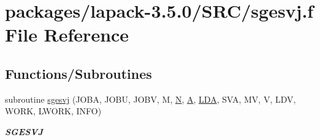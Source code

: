 \hypertarget{sgesvj_8f}{}\section{packages/lapack-\/3.5.0/\+S\+R\+C/sgesvj.f File Reference}
\label{sgesvj_8f}
\subsection*{Functions/\+Subroutines}
\begin{DoxyCompactItemize}
\item 
subroutine \hyperlink{group__realGEcomputational_ga461f4ac32685a5ca30e293ee73d32920}{sgesvj} (J\+O\+B\+A, J\+O\+B\+U, J\+O\+B\+V, M, \hyperlink{polmisc_8c_a0240ac851181b84ac374872dc5434ee4}{N}, \hyperlink{classA}{A}, \hyperlink{example__user_8c_ae946da542ce0db94dced19b2ecefd1aa}{L\+D\+A}, S\+V\+A, M\+V, V, L\+D\+V, W\+O\+R\+K, L\+W\+O\+R\+K, I\+N\+F\+O)
\begin{DoxyCompactList}\small\item\em {\bfseries S\+G\+E\+S\+V\+J} \end{DoxyCompactList}\end{DoxyCompactItemize}
